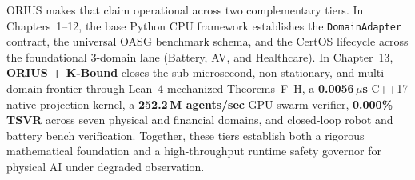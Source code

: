 ORIUS makes that claim operational across two complementary tiers. In Chapters~1--12, the
base Python CPU framework establishes the \texttt{DomainAdapter} contract, the universal
OASG benchmark schema, and the CertOS lifecycle across the foundational 3-domain lane
(Battery, AV, and Healthcare). In Chapter~13, \textbf{ORIUS + K-Bound} closes the
sub-microsecond, non-stationary, and multi-domain frontier through Lean~4 mechanized
Theorems~F--H, a \textbf{0.0056\,$\mu$s} C++17 native projection kernel, a \textbf{252.2\,M
agents/sec} GPU swarm verifier, \textbf{0.000\% TSVR} across seven physical and financial
domains, and closed-loop robot and battery bench verification. Together, these tiers
establish both a rigorous mathematical foundation and a high-throughput runtime safety
governor for physical AI under degraded observation.
